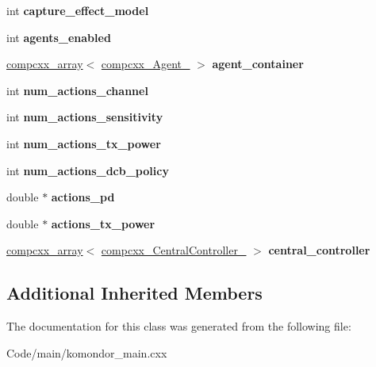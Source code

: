 \begin{DoxyCompactItemize}
int {\bfseries capture\+\_\+effect\+\_\+model}
\item 
\mbox{\label{classcompcxx__Komondor__27_ad8c341fe2e5f1752fbbb8a4d0d82315b}} 
int {\bfseries agents\+\_\+enabled}
\item 
\mbox{\label{classcompcxx__Komondor__27_a0c84a07ddb506e8fcf39b3df53694e48}} 
\hyperlink{classcompcxx__array}{compcxx\+\_\+array}$<$ \hyperlink{classcompcxx__Agent__25}{compcxx\+\_\+\+Agent\+\_} $>$ {\bfseries agent\+\_\+container}
\item 
\mbox{\label{classcompcxx__Komondor__27_a3dd07c6012e9d97f9c8c7b378d658a11}} 
int {\bfseries num\+\_\+actions\+\_\+channel}
\item 
\mbox{\label{classcompcxx__Komondor__27_ae7e343e99ce6848638e4af5b5f22887a}} 
int {\bfseries num\+\_\+actions\+\_\+sensitivity}
\item 
\mbox{\label{classcompcxx__Komondor__27_a0586fc1ed648eb37b1ddbcceb7a7fe8a}} 
int {\bfseries num\+\_\+actions\+\_\+tx\+\_\+power}
\item 
\mbox{\label{classcompcxx__Komondor__27_a8470be07bb5bf607fa0d28131cf2fcb5}} 
int {\bfseries num\+\_\+actions\+\_\+dcb\+\_\+policy}
\item 
\mbox{\label{classcompcxx__Komondor__27_adb8e5f0a4d6e1d6dff05e09f945a9eb9}} 
double $\ast$ {\bfseries actions\+\_\+pd}
\item 
\mbox{\label{classcompcxx__Komondor__27_a65c79608c259c00aad2391d9510ca369}} 
double $\ast$ {\bfseries actions\+\_\+tx\+\_\+power}
\item 
\mbox{\label{classcompcxx__Komondor__27_a952a605a9fc1418b6993abbdf297e2b5}} 
\hyperlink{classcompcxx__array}{compcxx\+\_\+array}$<$ \hyperlink{classcompcxx__CentralController__26}{compcxx\+\_\+\+Central\+Controller\+\_} $>$ {\bfseries central\+\_\+controller}
\end{DoxyCompactItemize}
\subsection*{Additional Inherited Members}


The documentation for this class was generated from the following file\+:\begin{DoxyCompactItemize}
\item 
Code/main/komondor\+\_\+main.\+cxx\end{DoxyCompactItemize}
